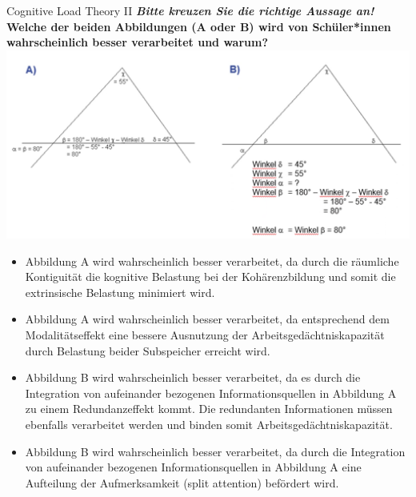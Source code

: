 \documentclass[a4paper]{article}
\newcommand{\ACorrectAnswer}{\rlap{$\square$}{\raisebox{2pt}{\large\hspace{1pt}\ding{51}}}\hspace{-2.5pt}}
\newcommand{\AWrongAnswer}{\rlap{$\square$}{\large\hspace{1pt}\ding{55}}}
\newcommand{\AnUnsureAnswer}{\rlap{$\square$}{\large\hspace{1pt}\textbf?}}
\newcommand{\defaultCorrect}{\ding{51}}
\newcommand{\defaultWrong}{\ding{55}}
\newcommand{\defaultUnsure}{\textbf{?}}
\newenvironment{answers}{\begin{itemize}}{\end{itemize}}
\newcommand{\correct}{\defaultCorrect}
\newcommand{\wrong}{\defaultWrong}
\newcommand{\unsure}{\defaultUnsure}
\newenvironment{question}[2]{%
    \section[#1 \normalfont(#2)]{#1\\\small\normalfont\hyperlink{tableofcontents}{zurück zum Inhaltsverzeichnis}}%
}{%
    \newpage%
}
\newcommand{\questiontext}[1]{\textbf{#1}}
\newcommand{\assignment}[1]{\textbf{\textit{#1}}\newline}
\newenvironment{multiple-choice}[1]{%
    \begin{question}{#1}{Multiple Choice}%
    \renewenvironment{answers}{%
        \begin{multiple-choice-list}}{\end{multiple-choice-list}%
    }%
    \renewcommand{\correct}{\ACorrectAnswer}%
    \renewcommand{\wrong}{\AWrongAnswer}%
    \renewcommand{\unsure}{\AnUnsureAnswer}%
}%
{%
    \renewcommand{\correct}{\defaultCorrect}%
    \renewcommand{\wrong}{\defaultWrong}%
    \renewcommand{\unsure}{\defaultUnsure}%
    \end{question}%
}
\begin{document}
\begin{multiple-choice}{Cognitive Load Theory II}
    \assignment{Bitte kreuzen Sie die richtige Aussage an!}
    \questiontext{Welche der beiden Abbildungen (A oder B) wird von Schüler*innen wahrscheinlich besser verarbeitet und warum?}\\
    \includegraphics[width=\fpeval{0.7*\textwidth}pt]{Cognitive Load Theory.png}
    \begin{answers}
        \item[\correct] Abbildung A wird wahrscheinlich besser verarbeitet, da durch die räumliche Kontiguität die kognitive Belastung bei der Kohärenzbildung und somit die extrinsische Belastung minimiert wird.
        \item[\wrong] Abbildung A wird wahrscheinlich besser verarbeitet, da entsprechend dem Modalitätseffekt eine bessere Ausnutzung der Arbeitsgedächtniskapazität durch Belastung beider Subspeicher erreicht wird.
        \item[\wrong] Abbildung B wird wahrscheinlich besser verarbeitet, da es durch die Integration von aufeinander bezogenen Informationsquellen in Abbildung A zu einem Redundanzeffekt kommt. Die redundanten Informationen müssen ebenfalls verarbeitet werden und binden somit Arbeitsgedächtniskapazität.
        \item[\wrong] Abbildung B wird wahrscheinlich besser verarbeitet, da durch die Integration von aufeinander bezogenen Informationsquellen in Abbildung A eine Aufteilung der Aufmerksamkeit (split attention) befördert wird.
    \end{answers}
\end{multiple-choice}
\end{document}

